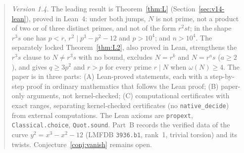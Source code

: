 \documentclass[11pt,reqno]{amsart}
\theoremstyle{definition}
\begin{document}
\begin{abstract}
\emph{Version 1.4.} The leading result is Theorem~\ref{thm:L} (Section~\ref{sec:v14-lean}), proved in Lean~4: under both jumps, \(N\) is not prime, not a product of two or of three distinct primes, and not of the form \(r^2st\); in the shape \(r^3s\) one has \(p<r\), \(r^2\mid p^3-p^2-12\) and \(p>10^4\); and \(n>10^4\). The separately locked Theorem~\ref{thm:L2}, also proved in Lean, strengthens the \(r^3s\) clause to \(N\ne r^3s\) with no bound, excludes \(N=r^k\) and \(N=r^as\) (\(a\ge 2\)), and gives \(q\ge 3p^2\) and \(r>p\) for every prime \(r\mid N\) when \(\omega(N)\ge 4\). The paper is in three parts: (A) Lean-proved statements, each with a step-by-step proof in ordinary mathematics that follows the Lean proof; (B) paper-only arguments, not kernel-checked; (C) computational certificates with exact ranges, separating kernel-checked certificates (no \texttt{native\_decide}) from external computations. The Lean axioms are \texttt{propext}, \texttt{Classical.choice}, \texttt{Quot.sound}. Part~B records the verified data of the curve \(y^2=x^3-x^2-12\) (LMFDB \texttt{3936.b1}, rank~1, trivial torsion) and its twists. Conjecture~\ref{conj:vanish} remains open.
\end{abstract}

\maketitle
\end{document}
